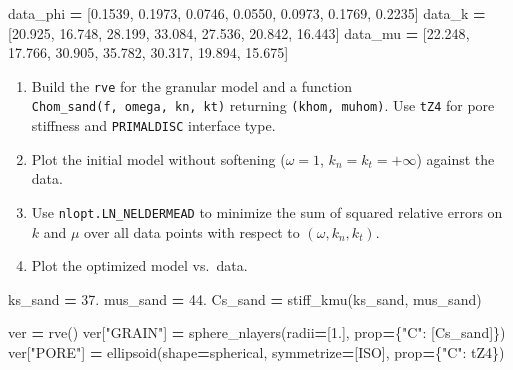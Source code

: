 \documentclass[
  a4paper,
  numbers=noendperiod,
  DIV=12]{scrreprt}
\newenvironment{Shaded}{\begin{snugshade}}{\end{snugshade}}
\newcommand{\FloatTok}[1]{\textcolor[rgb]{0.00,0.00,0.81}{#1}}
\newcommand{\NormalTok}[1]{#1}
\newcommand{\OperatorTok}[1]{\textcolor[rgb]{0.81,0.36,0.00}{\textbf{#1}}}
\newcommand{\StringTok}[1]{\textcolor[rgb]{0.31,0.60,0.02}{#1}}
\begin{document}
\begin{tcolorbox}
\begin{Shaded}
\begin{Highlighting}[]
\NormalTok{data\_phi }\OperatorTok{=}\NormalTok{ [}\FloatTok{0.1539}\NormalTok{, }\FloatTok{0.1973}\NormalTok{, }\FloatTok{0.0746}\NormalTok{, }\FloatTok{0.0550}\NormalTok{, }\FloatTok{0.0973}\NormalTok{, }\FloatTok{0.1769}\NormalTok{, }\FloatTok{0.2235}\NormalTok{]}
\NormalTok{data\_k   }\OperatorTok{=}\NormalTok{ [}\FloatTok{20.925}\NormalTok{, }\FloatTok{16.748}\NormalTok{, }\FloatTok{28.199}\NormalTok{, }\FloatTok{33.084}\NormalTok{, }\FloatTok{27.536}\NormalTok{, }\FloatTok{20.842}\NormalTok{, }\FloatTok{16.443}\NormalTok{]}
\NormalTok{data\_mu  }\OperatorTok{=}\NormalTok{ [}\FloatTok{22.248}\NormalTok{, }\FloatTok{17.766}\NormalTok{, }\FloatTok{30.905}\NormalTok{, }\FloatTok{35.782}\NormalTok{, }\FloatTok{30.317}\NormalTok{, }\FloatTok{19.894}\NormalTok{, }\FloatTok{15.675}\NormalTok{]}
\end{Highlighting}
\end{Shaded}

\begin{enumerate}
\def\labelenumi{\arabic{enumi}.}
\item
  Build the \texttt{rve} for the granular model and a function
  \texttt{Chom\_sand(f,\ omega,\ kn,\ kt)} returning
  \texttt{(khom,\ muhom)}. Use \texttt{tZ4} for pore stiffness and
  \texttt{PRIMALDISC} interface type.
\item
  Plot the initial model without softening (\(\omega=1\),
  \(k_n = k_t = +\infty\)) against the data.
\item
  Use \texttt{nlopt.LN\_NELDERMEAD} to minimize the sum of squared
  relative errors on \(k\) and \(\mu\) over all data points with respect
  to \((\omega, k_n, k_t)\).
\item
  Plot the optimized model vs.~data.
\end{enumerate}

\begin{Shaded}
\begin{Highlighting}[]
\NormalTok{ks\_sand }\OperatorTok{=} \FloatTok{37.}
\NormalTok{mus\_sand }\OperatorTok{=} \FloatTok{44.}
\NormalTok{Cs\_sand }\OperatorTok{=}\NormalTok{ stiff\_kmu(ks\_sand, mus\_sand)}

\NormalTok{ver }\OperatorTok{=}\NormalTok{ rve()}
\NormalTok{ver[}\StringTok{"GRAIN"}\NormalTok{] }\OperatorTok{=}\NormalTok{ sphere\_nlayers(radii}\OperatorTok{=}\NormalTok{[}\FloatTok{1.}\NormalTok{], prop}\OperatorTok{=}\NormalTok{\{}\StringTok{"C"}\NormalTok{: [Cs\_sand]\})}
\NormalTok{ver[}\StringTok{"PORE"}\NormalTok{]  }\OperatorTok{=}\NormalTok{ ellipsoid(shape}\OperatorTok{=}\NormalTok{spherical, symmetrize}\OperatorTok{=}\NormalTok{[ISO], prop}\OperatorTok{=}\NormalTok{\{}\StringTok{"C"}\NormalTok{: tZ4\})}


\end{Highlighting}
\end{Shaded}
\end{tcolorbox}
\end{document}

